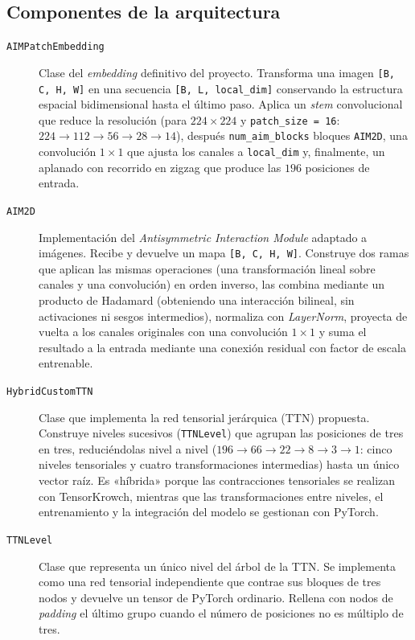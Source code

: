\subsection*{Componentes de la arquitectura}

\begin{description}
  \item[\texttt{AIMPatchEmbedding}] Clase del \textit{embedding} definitivo del proyecto. Transforma una imagen \texttt{[B, C, H, W]} en una secuencia \texttt{[B, L, local\_dim]} conservando la estructura espacial bidimensional hasta el último paso. Aplica un \textit{stem} convolucional que reduce la resolución (para $224\times224$ y \texttt{patch\_size = 16}: $224\to112\to56\to28\to14$), después \texttt{num\_aim\_blocks} bloques \texttt{AIM2D}, una convolución $1\times1$ que ajusta los canales a \texttt{local\_dim} y, finalmente, un aplanado con recorrido en zigzag que produce las $196$ posiciones de entrada.
  \item[\texttt{AIM2D}] Implementación del \textit{Antisymmetric Interaction Module} adaptado a imágenes. Recibe y devuelve un mapa \texttt{[B, C, H, W]}. Construye dos ramas que aplican las mismas operaciones (una transformación lineal sobre canales y una convolución) en orden inverso, las combina mediante un producto de Hadamard (obteniendo una interacción bilineal, sin activaciones ni sesgos intermedios), normaliza con \textit{LayerNorm}, proyecta de vuelta a los canales originales con una convolución $1\times1$ y suma el resultado a la entrada mediante una conexión residual con factor de escala entrenable.
  \item[\texttt{HybridCustomTTN}] Clase que implementa la red tensorial jerárquica (TTN) propuesta. Construye niveles sucesivos (\texttt{TTNLevel}) que agrupan las posiciones de tres en tres, reduciéndolas nivel a nivel ($196\to66\to22\to8\to3\to1$: cinco niveles tensoriales y cuatro transformaciones intermedias) hasta un único vector raíz. Es «híbrida» porque las contracciones tensoriales se realizan con TensorKrowch, mientras que las transformaciones entre niveles, el entrenamiento y la integración del modelo se gestionan con PyTorch.
  \item[\texttt{TTNLevel}] Clase que representa un único nivel del árbol de la TTN. Se implementa como una red tensorial independiente que contrae sus bloques de tres nodos y devuelve un tensor de PyTorch ordinario. Rellena con nodos de \textit{padding} el último grupo cuando el número de posiciones no es múltiplo de tres.

\end{description}
